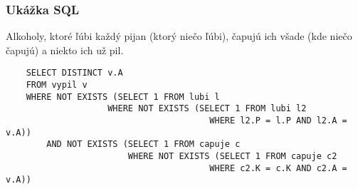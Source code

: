 \documentclass[12pt]{beamer}
\begin{document}
\begin{frame}[fragile]
\frametitle{Ukážka SQL}
Alkoholy, ktoré ľúbi každý pijan (ktorý niečo ľúbi), čapujú ich všade (kde niečo čapujú) a niekto ich už pil.
{\tiny
\begin{verbatim}
    SELECT DISTINCT v.A
    FROM vypil v
    WHERE NOT EXISTS (SELECT 1 FROM lubi l
                    WHERE NOT EXISTS (SELECT 1 FROM lubi l2
                                        WHERE l2.P = l.P AND l2.A = v.A))
        AND NOT EXISTS (SELECT 1 FROM capuje c
                        WHERE NOT EXISTS (SELECT 1 FROM capuje c2
                                        WHERE c2.K = c.K AND c2.A = v.A))
\end{verbatim}
}
\end{frame}
\end{document}
